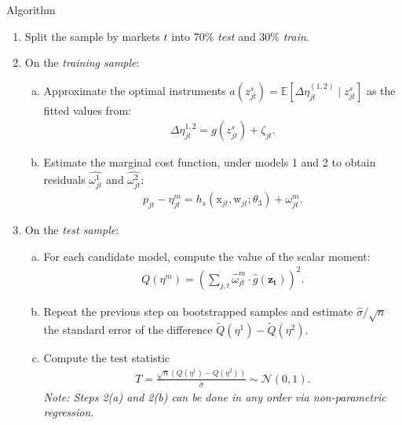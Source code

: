 \documentclass[aspectratio=169,10pt]{beamer}
\begin{document}
\begin{frame}[shrink=25,plain]{Algorithm}
\begin{enumerate}[(1)]
\item Split the sample by markets $t$ into 70\% \textit{test} and 30\% \textit{train}.
\item On the \textit{training sample}:
\begin{enumerate}[(a)]
\item Approximate the optimal instruments $a(z_{jt}^s) = \mathbb{E}[\Delta \eta_{jt}^{(1,2)} \mid z_{jt}^s]$ as the fitted values from:
\begin{align*}
    \Delta\eta_{jt}^{1,2} = g(z_{jt}^s) + \zeta_{jt}.
\end{align*}
\item Estimate the marginal cost function, under models 1 and 2 to obtain residuals $\widehat{\omega_{jt}^{1}}$ and $\widehat{\omega_{jt}^{2}}$:
 \begin{align*}
 p_{jt} -\eta^m_{jt}= h_s(\textrm{x}_{jt},\mathrm{w}_{jt}; \theta_3) + \omega^m_{jt}.
 \end{align*}
\end{enumerate}
\item On the \textit{test sample}:
\begin{enumerate}[(a)]
\item For each candidate model, compute the value of the scalar moment:\footnotemark
\begin{align*}
 Q(\eta^m) =\left(\sum_{j,t} \hat\omega_{jt}^m\cdot \hat{g}(\symbf{z_t}) \right)^2.
\end{align*}
\item Repeat the previous step on bootstrapped samples and estimate $\hat\sigma/\sqrt{n}$ the standard error of the difference $\tilde Q(\eta^1) - \tilde Q(\eta^2)$.
\item Compute the test statistic
\begin{align*}
T = \frac{\sqrt{n} \left(Q(\eta^1) -  Q(\eta^2) \right)}{\widehat{\sigma}} \sim \mathcal{N}(0,1).
\end{align*}
\textit{Note: Steps 2(a) and 2(b) can be done in any order via non-parametric regression.}
\end{enumerate}
\end{enumerate}
\end{frame}
\end{document}
